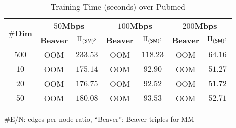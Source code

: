 \begin{table}[!t]
 	\centering
 	\caption{Training Time (seconds) over Pubmed}
 	\label{table:time_fea_dim_train_pubmed}
 \setlength\tabcolsep{3pt}
 	 	\begin{tabular}{c|c|c|c|c|c|c}
 	 	\hline
 \multirow{2}{*}{\textbf{$\#$Dim}} &\multicolumn{2}{c|}{\textbf{$50$Mbps}} &\multicolumn{2}{c|}{\textbf{$100$Mbps}}&\multicolumn{2}{c}{\textbf{$200$Mbps}}
 \\\cline{2-7}
 	& \textbf{Beaver} & ${\Pi_{\mathsf{(SM)^2}}}$ & \textbf{Beaver} & ${\Pi_{\mathsf{(SM)^2}}}$ & \textbf{Beaver} & ${\Pi_{\mathsf{(SM)^2}}}$ \\
 	 	\hline
 	 	 $500$&OOM&$233.53$ &OOM&$118.23$&OOM& $64.16$\\
 	 $10$&OOM&$175.14$&OOM &$92.90$&OOM& $51.27$\\
 	 $20$&OOM&$176.75$&OOM &$92.52$&OOM& $51.72$\\
 	 $50$&OOM&$180.08$&OOM &$93.53$&OOM& $52.71$\\\hline
 	 \end{tabular}
$\#$E/N: edges per node ratio,
``Beaver'': Beaver triples for MM
\end{table}
